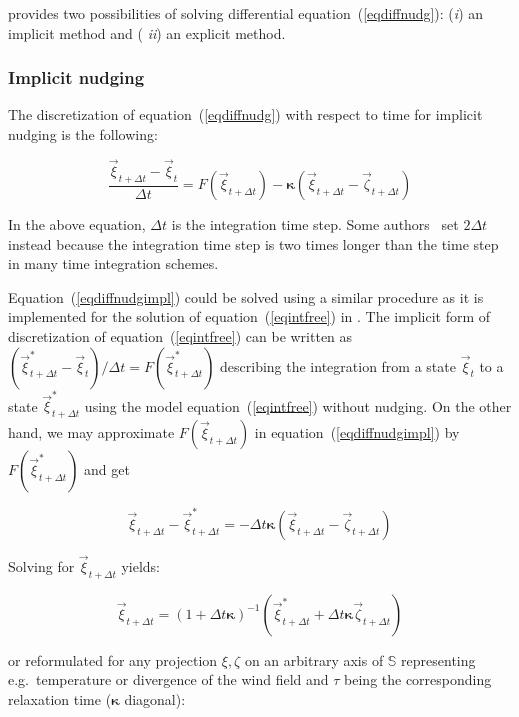 \begin{appendix}
\echam{} provides two possibilities of solving differential
equation~(\ref{eqdiffnudg}): ({\it i\/}) an implicit method and ({\it
  ii\/}) an explicit 
method.

\subsubsection{Implicit nudging}\label{secnudgimpl}

The discretization of equation~(\ref{eqdiffnudg}) with respect to time
for implicit nudging is the following:

\begin{equation}\label{eqdiffnudgimpl}
\frac{\vec{\xi}_{t+\Delta t}-\vec{\xi}_{t}}{\Delta t}
= F(\vec{\xi}_{t+\Delta t})-\boldsymbol{\kappa}(\vec{\xi}_{t+\Delta
  t}-\vec{\zeta}_{t+\Delta t}) 
\end{equation}

In the above equation, $\Delta t$ is the integration time step. Some
authors~\cite{kri913} set $2\Delta t$ instead because the integration
time step is two times longer than the time step in many time
integration schemes. 

Equation~(\ref{eqdiffnudgimpl}) could be solved using a similar
procedure as it is implemented for the solution of
equation~(\ref{eqintfree}) in \echam. The implicit form of
discretization of equation~(\ref{eqintfree})
can be written as
$(\vec{\xi}^\ast_{t+\Delta t}-\vec{\xi}_t)/\Delta
t=F(\vec{\xi}^\ast_{t+\Delta t})$ describing the integration from a
state $\vec{\xi}_t$ to a state $\vec{\xi}^\ast_{t+\Delta t}$ using the
model equation~(\ref{eqintfree}) without nudging. 
On the other hand, we may approximate
$F(\vec{\xi}_{t+\Delta t})$ in equation~(\ref{eqdiffnudgimpl}) by
$F(\vec{\xi}^\ast_{t+\Delta t})$ and 
get

\begin{displaymath}
\vec{\xi}_{t+\Delta t}-\vec{\xi}^\ast_{t+\Delta t} = - \Delta t
\boldsymbol{\kappa} (\vec{\xi}_{t+\Delta t}-\vec{\zeta}_{t+\Delta t})
\end{displaymath} 

Solving for $\vec{\xi}_{t+\Delta t}$ yields:

\begin{equation}\label{eqnudgimplvec}
\vec{\xi}_{t+\Delta t}=(1+\Delta t
\boldsymbol{\kappa})^{-1}(\vec{\xi}^\ast_{t+\Delta t}+\Delta t
\boldsymbol{\kappa}\vec{\zeta}_{t+\Delta t})
\end{equation}

or reformulated for any projection $\xi,\zeta$ on an arbitrary axis of
$\mathbb{S}$ representing e.g.~temperature or divergence of the wind
field and $\tau$ being the corresponding relaxation time
($\boldsymbol{\kappa}$ diagonal):


\end{appendix}
